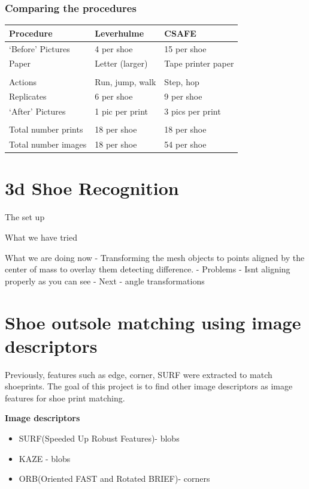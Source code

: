 \documentclass[]{book}
\providecommand{\tightlist}{%
  \setlength{\itemsep}{0pt}\setlength{\parskip}{0pt}}
\begin{document}
\hypertarget{comparing-the-procedures}{%
\subsubsection{Comparing the procedures}\label{comparing-the-procedures}}

\begin{longtable}[]{@{}lll@{}}
\toprule
Procedure & Leverhulme & CSAFE\tabularnewline
\midrule
\endhead
`Before' Pictures & 4 per shoe & 15 per shoe\tabularnewline
Paper & Letter (larger) & Tape printer paper\tabularnewline
& &\tabularnewline
Actions & Run, jump, walk & Step, hop\tabularnewline
Replicates & 6 per shoe & 9 per shoe\tabularnewline
`After' Pictures & 1 pic per print & 3 pics per print\tabularnewline
& &\tabularnewline
Total number prints & 18 per shoe & 18 per shoe\tabularnewline
Total number images & 18 per shoe & 54 per shoe\tabularnewline
\bottomrule
\end{longtable}

\hypertarget{d-shoe-recognition}{%
\section{3d Shoe Recognition}\label{d-shoe-recognition}}

The set up

What we have tried

What we are doing now
- Transforming the mesh objects to points aligned by the center of mass to overlay them detecting difference.
- Problems
- Isnt aligning properly as you can see
- Next
- angle transformations

\hypertarget{shoe-outsole-matching-using-image-descriptors}{%
\section{Shoe outsole matching using image descriptors}\label{shoe-outsole-matching-using-image-descriptors}}

Previously, features such as edge, corner, SURF were extracted to match shoeprints. The goal of this project is to find other image descriptors as image features for shoe print matching.

\textbf{Image descriptors}

\begin{itemize}
\tightlist
\item
  SURF(Speeded Up Robust Features)- blobs
\item
  KAZE - blobs
\item
  ORB(Oriented FAST and Rotated BRIEF)- corners
\end{itemize}
\end{document}
